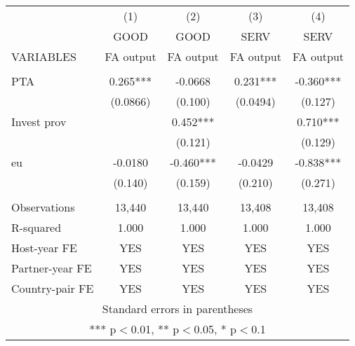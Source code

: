 \begin{tabular}{lcccc} \hline
 & (1) & (2) & (3) & (4) \\
 & GOOD & GOOD & SERV & SERV \\
VARIABLES & FA output & FA output & FA output & FA output \\ \hline
 &  &  &  &  \\
PTA & 0.265*** & -0.0668 & 0.231*** & -0.360*** \\
 & (0.0866) & (0.100) & (0.0494) & (0.127) \\
Invest prov &  & 0.452*** &  & 0.710*** \\
 &  & (0.121) &  & (0.129) \\
eu & -0.0180 & -0.460*** & -0.0429 & -0.838*** \\
 & (0.140) & (0.159) & (0.210) & (0.271) \\
 &  &  &  &  \\
Observations & 13,440 & 13,440 & 13,408 & 13,408 \\
R-squared & 1.000 & 1.000 & 1.000 & 1.000 \\
Host-year FE & YES & YES & YES & YES \\
Partner-year FE & YES & YES & YES & YES \\
 Country-pair FE & YES & YES & YES & YES \\ \hline
\multicolumn{5}{c}{ Standard errors in parentheses} \\
\multicolumn{5}{c}{ *** p$<$0.01, ** p$<$0.05, * p$<$0.1} \\
\end{tabular}
